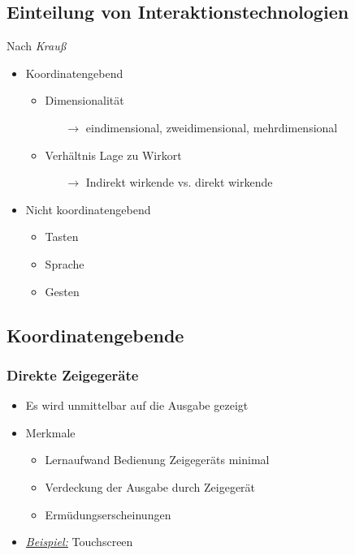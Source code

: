\documentclass
[
	8pt,		%
	ngerman,	%
	a4paper,	%
	landscape,	%
	final		%
]{extarticle}
\newcommand{\example}{\textit{\underline{Beispiel:} }}
\begin{document}
\begin{multicols*}{4}
	\subsection{Einteilung von Interaktionstechnologien}
	Nach \emph{Krauß}
	\begin{itemize}[nolistsep]
		\item Koordinatengebend
		      \begin{itemize}[nolistsep]
			      \item Dimensionalität
			            \begin{itemize}[nolistsep]
				            \item[\(\rightarrow\)] eindimensional,
				                  zweidimensional, mehrdimensional
			            \end{itemize}
			      \item Verhältnis Lage zu Wirkort
			            \begin{itemize}[nolistsep]
				            \item[\(\rightarrow\)] Indirekt wirkende vs. direkt
				                  wirkende
			            \end{itemize}
		      \end{itemize}
		\item Nicht koordinatengebend
		      \begin{itemize}[nolistsep]
			      \item Tasten
			      \item Sprache
			      \item Gesten
		      \end{itemize}
	\end{itemize}
	\subsection{Koordinatengebende}
	\subsubsection{Direkte Zeigegeräte}
	\begin{itemize}
		\item Es wird unmittelbar auf die Ausgabe gezeigt
		\item Merkmale
		      \begin{itemize}[nolistsep]
			      \item Lernaufwand Bedienung Zeigegeräts minimal
			      \item Verdeckung der Ausgabe durch Zeigegerät
			      \item Ermüdungserscheinungen
		      \end{itemize}
		\item \example Touchscreen
	\end{itemize}

\end{multicols*}
\end{document}
